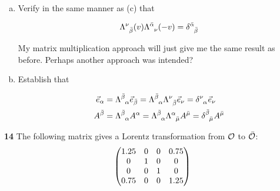 \documentclass[gr-notes.tex]{subfiles}
\begin{document}
\begin{enumerate}[(a)]
\item Verify in the same manner as (c) that

  \begin{displaymath}
    \tensor{\Lambda}{^\nu_{\bar\beta}}(v)
    \tensor{\Lambda}{^{\bar\alpha}_\nu}(-v) =
    \tensor{\delta}{^{\bar\alpha}_{\bar\beta}}
  \end{displaymath}

  My matrix multiplication approach will just give me the same result as before. Perhaps another approach was intended?


\item Establish that

  \begin{align*}
    \vec{e}_\alpha &=
    \tensor{\Lambda}{^{\bar\beta}_\alpha} \vec{e}_{\bar\beta} =
    \tensor{\Lambda}{^{\bar\beta}_\alpha} \tensor{\Lambda}{^\nu_{\bar\beta}}
    \vec{e}_\nu =
    \tensor{\delta}{^\nu_\alpha} \vec{e}_\nu
    \\
    A^{\bar\beta} &=
    \tensor{\Lambda}{^{\bar\beta}_\alpha} A^\alpha =
    \tensor{\Lambda}{^{\bar\beta}_\alpha} \tensor{\Lambda}{^\alpha_{\bar\mu}}
    A^{\bar\mu} =
    \tensor{\delta}{^{\bar\beta}_{\bar\mu}} A^{\bar\mu}
  \end{align*}


\end{enumerate}



\textbf{14}
The following matrix gives a Lorentz transformation from $\mathcal{O}$ to $\bar{\mathcal{O}}$:
\begin{displaymath}
  \mqty(
    1.25 & 0 & 0 & 0.75
    \\
    0 & 1 & 0 & 0
    \\
    0 & 0 & 1 & 0
    \\
    0.75 & 0 & 0 & 1.25
  )
\end{displaymath}
\end{document}
